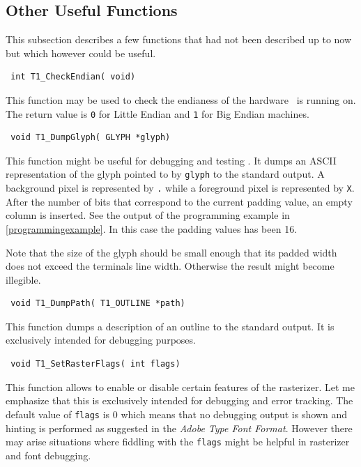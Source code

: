 \subsection{Other Useful Functions}
\label{otherfunctions}%
This subsection describes a few functions that had not been described up to
now but which however could be useful.

\precorr
\begin{verbatim}
 int T1_CheckEndian( void)
\end{verbatim}\postcorr
This function may be used to check the endianess of the hardware \tonelib\ is
running on. The return value is \verb+0+ for Little Endian and \verb+1+ for
Big Endian machines.

\precorr
\begin{verbatim}
 void T1_DumpGlyph( GLYPH *glyph)
\end{verbatim}\postcorr
This function might be useful for debugging and testing \tonelib. It dumps an
ASCII representation of the glyph pointed to by \verb+glyph+ to the standard
output. A background pixel is represented by \verb+.+ while a foreground pixel
is represented by \verb+X+. After the number of bits that correspond to the
current padding value, an empty column is inserted. See the output of the
programming example in \ref{programmingexample}. In this case the padding
values has been 16.

Note that the size of the glyph should be small enough that its padded width
does not exceed the terminals line width. Otherwise the result might become
illegible. 

\precorr
\begin{verbatim}
 void T1_DumpPath( T1_OUTLINE *path)
\end{verbatim}\postcorr
This function dumps a description of an outline to the standard output. It is
exclusively intended for debugging purposes.


\precorr
\begin{verbatim}
 void T1_SetRasterFlags( int flags)
\end{verbatim}\postcorr
This function allows to enable or disable certain features of the
rasterizer. Let me emphasize that this is exclusively intended for debugging
and error tracking. The default value of \verb+flags+ is 0 which means that no
debugging output is shown and hinting is performed as suggested in the {\em Adobe
Type Font Format}. However there may arise situations where fiddling with the
\verb+flags+ might be helpful in rasterizer and font debugging. 

